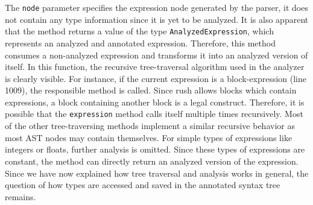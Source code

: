 The \texttt{node} parameter specifies the expression node generated by the parser,
it does not contain any type information since it is yet to be analyzed.
It is also apparent that the method returns a value of the type \texttt{AnalyzedExpression},
which represents an analyzed and annotated expression.
Therefore, this method consumes a non-analyzed expression and transforms it into an analyzed version of itself.
In this function, the recursive tree-traversal algorithm used in the analyzer is clearly visible.
For instance, if the current expression is a block-expression (line 1009), the responsible method is called.
Since rush allows blocks which contain expressions, a block containing another block is a legal construct.
Therefore, it is possible that the \texttt{expression} method calls itself multiple times recursively.
Most of the other tree-traversing methods implement a similar recursive behavior as most AST nodes may contain themselves.
For simple types of expressions like integers or floats, further analysis is omitted.
Since these types of expressions are constant, the method can directly return an analyzed version of the expression.
Since we have now explained how tree traversal and analysis works in general, the question of how types are accessed and saved in the annotated syntax tree remains.


